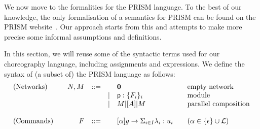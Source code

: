 We now move to the formalities for the PRISM language. To the best of
our knowledge, the only formalisation of a semantics for PRISM can be
found on the PRISM website~\cite{prismemantics}. Our approach starts
from this and attempts to make more precise some informal assumptions
and definitions.

\smallskip

 In this section, we will reuse some of the syntactic
terms used for our choreography language, including assignments and
expressions. We define the syntax of (a subset of) the PRISM language
as follows:
\begin{displaymath}
  \begin{array}{lrlll@{\qquad}l}
    \text{(Networks)}  \quad
    & N, M  & ::=  &      & \CEnd & \text{empty network}\\
    &       &      & \mid & \role{p}:\{F_i\}_i & \text{module}\\
    &       &      & \mid & M \ppp A M & \text{parallel composition}\\
    \\
    \text{(Commands)}  \quad
    & F     & ::=  &      & \command \alpha g\lambda u
                                  & \text{} (\alpha\in\{\epsilon\}\cup\mathcal L) \\
  \end{array}
\end{displaymath}
